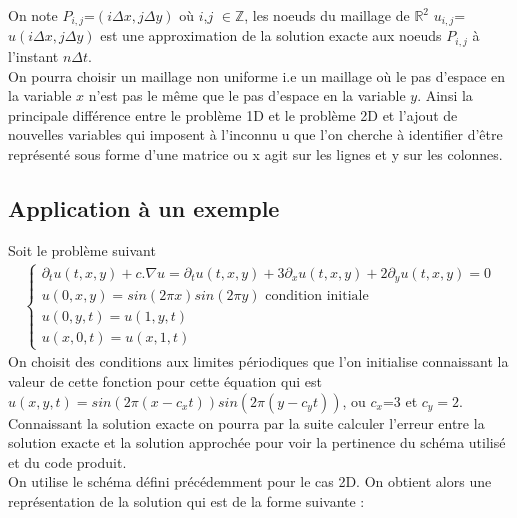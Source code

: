 \documentclass[12pt]{article}
\begin{document}
On note $P_{i,j}$=$(i \Delta x,j \Delta y)$ où $i$,$j$ $\in\mathbb{Z}$, les noeuds du maillage de $\mathbb{R}^2$  $u_{i,j}$=$u(i \Delta x,j \Delta y)$ est une approximation de la solution exacte aux noeuds $P_{i,j}$ à l'instant $n\Delta t$.
\\On pourra choisir un maillage non uniforme i.e un maillage où le pas d'espace en la variable $x$ n'est pas le même que le pas d'espace en la variable $y$.
Ainsi la principale différence entre le problème 1D et le problème 2D et l'ajout de nouvelles variables qui imposent à l'inconnu u que l'on cherche à identifier d'être représenté sous forme d'une matrice ou x agit sur les lignes et y sur les colonnes.
\subsection{Application à un exemple}
Soit le problème suivant
\begin{eqnarray*}
      \left\{
        \begin{array}{llll}
            \partial_tu(t,x,y)+c.\nabla u=\partial_tu(t,x,y) +3\partial_xu(t,x,y)+2\partial_yu(t,x,y)=0
            \\ u(0,x,y)=sin(2\pi x)sin(2\pi y) \text{ condition initiale}
            \\u(0,y,t)=u(1,y,t)
            \\u(x,0,t)=u(x,1,t)
        \end{array}
    \right .
\end{eqnarray*}
On choisit des conditions aux limites périodiques que l'on initialise connaissant la valeur de cette fonction pour cette équation qui est $u(x,y,t)=sin(2\pi (x-c_xt))sin(2\pi(y-c_yt))$, ou $c_x$=3 et $c_y=2$.
Connaissant la solution exacte on pourra par la suite calculer l'erreur entre la solution exacte et la solution approchée pour voir la pertinence du schéma utilisé et du code produit.
\\On utilise le schéma défini précédemment pour le cas 2D. On obtient alors une représentation de la solution qui est de la forme suivante :
\end{document}

